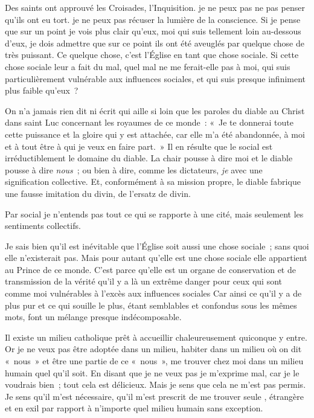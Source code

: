 \documentclass[french,twoside]{book} %
\begin{document}
Des saints ont approuvé les Croisades, l'Inquisition. je ne peux pas ne pas penser qu'ils ont eu tort. je ne peux pas récuser la lumière de la conscience. Si je pense que sur un point je vois plus clair qu'eux, moi qui suis tellement loin au-dessous d'eux, je dois admettre que sur ce point ils ont été aveuglés par quelque chose de très puissant. Ce quelque chose, c'est l'Église en tant que chose sociale. Si cette chose sociale leur a fait du mal, quel mal ne me ferait-elle pas à moi, qui suis particulièrement vulnérable aux influences sociales, et qui suis presque infiniment plus faible qu'eux ?\par
On n'a jamais rien dit ni écrit qui aille si loin que les paroles du diable au Christ dans saint Luc concernant les royaumes de ce monde : « Je te donnerai toute cette puissance et la gloire qui y est attachée, car elle m'a été abandonnée, à moi et à tout être à qui je veux en faire part. » Il en résulte que le social est irréductiblement le domaine du diable. La chair pousse à dire moi et le diable pousse à dire {\itshape nous} ; ou bien à dire, comme les dictateurs, {\itshape je} avec une signification collective. Et, conformément à sa mission propre, le diable fabrique une fausse imitation du divin, de l'ersatz de divin.\par
Par social je n'entends pas tout ce qui se rapporte à une cité, mais seulement les sentiments collectifs.\par
Je sais bien qu'il est inévitable que l'Église soit aussi une chose sociale ; sans quoi elle n'existerait pas. Mais pour autant qu'elle est une chose sociale elle appartient au Prince de ce monde. C'est parce qu'elle est un organe de conservation et de transmission de la vérité qu'il y a là un extrême danger pour ceux qui sont comme moi vulnérables à l'excès aux influences sociales Car ainsi ce qu'il y a de plus pur et ce qui souille le plus, étant semblables et confondus sous les mêmes mots, font un mélange presque indécomposable.\par
Il existe un milieu catholique prêt à accueillir chaleureusement quiconque y entre. Or je ne veux pas être adoptée dans un milieu, habiter dans un milieu où on dit « nous » et être une partie de ce « nous », me trouver chez moi dans un milieu humain quel qu'il soit. En disant que je ne veux pas je m'exprime mal, car je le voudrais bien ; tout cela est délicieux. Mais je sens que cela ne m'est pas permis. Je sens qu'il m'est nécessaire, qu'il m'est prescrit de me trouver seule , étrangère et en exil par rapport à n'importe quel milieu humain sans exception.\par
\end{document}
